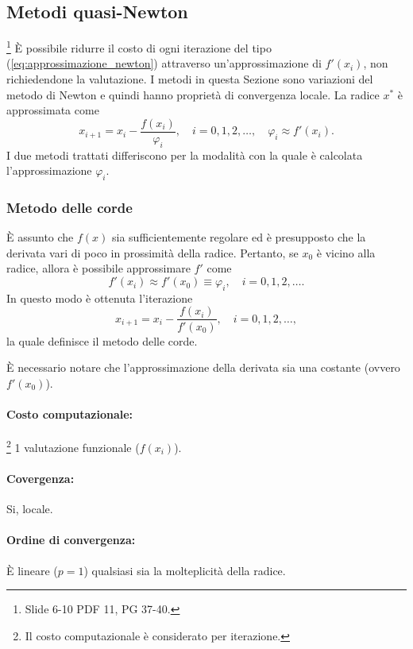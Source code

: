 \subsection{Metodi quasi-Newton}
\footnote{Slide 6-10 PDF 11, PG 37-40.}
È possibile ridurre il costo di ogni iterazione del tipo (\ref{eq:approssimazione_newton}) attraverso un'approssimazione di $f'(x_i)$, non richiedendone la valutazione. I metodi in questa Sezione sono variazioni del metodo di Newton e quindi hanno proprietà di convergenza locale. La radice $x^*$ è approssimata come
\begin{equation}\label{eq:approssimazione_quasi_newton}
	x_{i+1}=x_i-\frac{f(x_i)}{\varphi_i}, \quad i=0,1,2,\hdots, \quad\varphi_i\approx f'(x_i).
\end{equation}
I due metodi trattati differiscono per la modalità con la quale è calcolata l'approssimazione $\varphi_i$.

\subsubsection{Metodo delle corde}\label{sssec:metodo_corde}
È assunto che $f(x)$ sia sufficientemente regolare ed è presupposto che la derivata vari di poco in prossimità della radice.
Pertanto, se $x_0$ è vicino alla radice, allora è possibile approssimare $f'$ come
\begin{equation*}
	f'(x_i)\approx f'(x_0)\equiv\varphi_i,\quad i=0,1,2,\hdots.
\end{equation*}
In questo modo è ottenuta l'iterazione 
\begin{equation}\label{eq:approxCorde}
	x_{i+1}=x_i-\frac{f(x_i)}{f'(x_0)}, \quad i=0,1,2,\hdots,
\end{equation}
la quale definisce il metodo delle corde.

\noindent È necessario notare che l'approssimazione della derivata sia una costante (ovvero $f'(x_0)$).

\paragraph{Costo computazionale:}\footnote{Il costo computazionale è considerato per iterazione.} 1 valutazione funzionale ($f(x_i)$).
\paragraph{Covergenza:}Si, locale.
\paragraph{Ordine di convergenza:} È lineare ($p = 1$) qualsiasi sia la molteplicità della radice.

